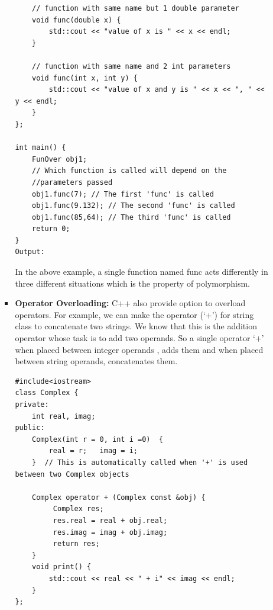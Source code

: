 \documentclass[main]{subfiles}
\begin{document}
\begin{itemize}
\begin{enumerate}
\begin{itemize}
\begin{verbatim}
    // function with same name but 1 double parameter 
    void func(double x) { 
        std::cout << "value of x is " << x << endl; 
    } 
      
    // function with same name and 2 int parameters 
    void func(int x, int y) { 
        std::cout << "value of x and y is " << x << ", " << y << endl; 
    } 
}; 
  
int main() { 
    FunOver obj1; 
    // Which function is called will depend on the
    //parameters passed 
    obj1.func(7); // The first 'func' is called
    obj1.func(9.132); // The second 'func' is called 
    obj1.func(85,64); // The third 'func' is called 
    return 0; 
}  
Output:
            \end{verbatim}
            In the above example, a single function named func acts differently in three different situations which is the property of polymorphism.
            \item\textbf{Operator Overloading:} C++ also provide option to overload operators. For example, we can make the operator (‘+’) for string class to concatenate two strings. We know that this is the addition operator whose task is to add two operands. So a single operator ‘+’ when placed between integer operands , adds them and when placed between string operands, concatenates them.
            \begin{verbatim}
#include<iostream> 
class Complex { 
private: 
    int real, imag; 
public: 
    Complex(int r = 0, int i =0)  {
        real = r;   imag = i;
    }  // This is automatically called when '+' is used between two Complex objects 
    
    Complex operator + (Complex const &obj) { 
         Complex res; 
         res.real = real + obj.real; 
         res.imag = imag + obj.imag; 
         return res; 
    } 
    void print() { 
        std::cout << real << " + i" << imag << endl; 
    } 
}; 
   

\end{verbatim}
\end{itemize}
\end{enumerate}
\end{itemize}
\end{document}
